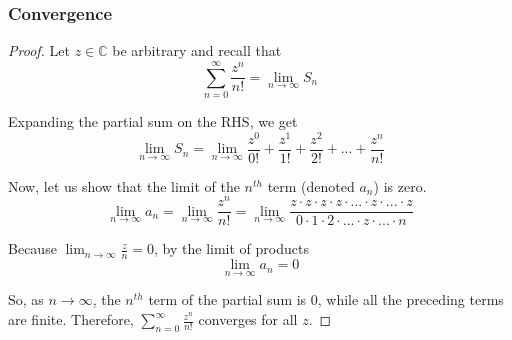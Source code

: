\documentclass[]{article}
\begin{document}
\subsubsection{Convergence}
\begin{proof}
	Let $z \in \mathbb{C}$ be arbitrary and recall that
	\[\sum^{\infty}_{n=0} \frac{z^n}{n!} = \lim_{n \rightarrow \infty} S_n \]
	
	Expanding the partial sum on the RHS, we get
	\[
	\lim_{n \rightarrow \infty} S_n
	= \lim_{n \rightarrow \infty} \frac{z^0}{0!} + \frac{z^1}{1!} + \frac{z^2}{2!} +
	... + \frac{z^n}{n!}
	\]
	
	Now, let us show that the limit of the $n^{th}$ term (denoted $a_n$) is zero.
	\[
	\lim_{n \rightarrow \infty} a_n
	= \lim_{n \rightarrow \infty} \frac{z^n}{n!}
	= \lim_{n \rightarrow \infty} \frac{z \cdot z \cdot z \cdot z \cdot ... \cdot z \cdot ... \cdot z}{0 \cdot 1 \cdot 2 \cdot ... \cdot z \cdot ... \cdot n}
	\]
	
	Because $\lim_{n \rightarrow \infty} \frac{z}{n} = 0$, by the limit of products
	\[\lim_{n \rightarrow \infty} a_n = 0\]
	
	So, as $n \rightarrow \infty$, the $n^{th}$ term of the partial sum is 0, while all the preceding terms are finite. Therefore, $\sum^{\infty}_{n=0} \frac{z^n}{n!}$ converges for all $z$.
\end{proof}
\end{document}
